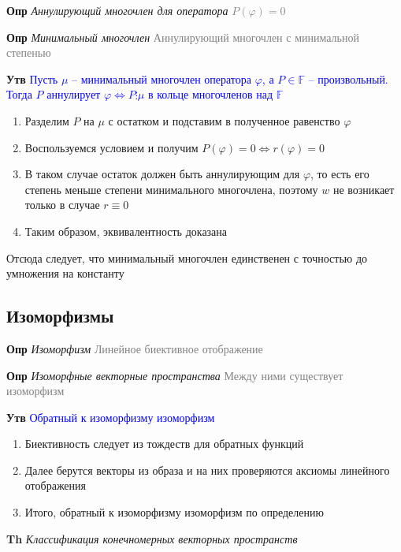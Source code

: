\textbf{Опр} \textit{Аннулирующий многочлен для оператора} \textcolor{gray}{$P(\varphi) = 0$}

\textbf{Опр} \textit{Минимальный многочлен} \textcolor{gray}{Аннулирующий многочлен с минимальной степенью}

\textbf{Утв} \textcolor{blue}{Пусть $\mu$ -- минимальный многочлен оператора $\varphi$, а $P \in \mathbb{F}$ --
произвольный.
Тогда $P$ аннулирует $\varphi \Leftrightarrow P \vdots \mu$ в кольце многочленов над $\mathbb{F}$}

\begin{enumerate}
    \item Разделим $P$ на $\mu$ с остатком и подставим в полученное равенство $\varphi$
    \item Воспользуемся условием и получим $P(\varphi) = 0 \Leftrightarrow r(\varphi) = 0$
    \item В таком случае остаток должен быть аннулирующим для $\varphi$, то есть его степень меньше степени
    минимального многочлена, поэтому $w$ не возникает только в случае $r \equiv 0$
    \item Таким образом, эквивалентность доказана
\end{enumerate}

Отсюда следует, что минимальный многочлен единственен с точностью до умножения на константу

\subsection{Изоморфизмы}

\textbf{Опр} \textit{Изоморфизм} \textcolor{gray}{Линейное биективное отображение}

\textbf{Опр} \textit{Изоморфные векторные пространства} \textcolor{gray}{Между ними существует изоморфизм}

\textbf{Утв} \textcolor{blue}{Обратный к изоморфизму изоморфизм}

\begin{enumerate}
    \item Биективность следует из тождеств для обратных функций
    \item Далее берутся векторы из образа и на них проверяются аксиомы линейного отображения
    \item Итого, обратный к изоморфизму изоморфизм по определению
\end{enumerate}

\textbf{Th} \textit{Классификация конечномерных векторных пространств}

